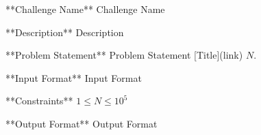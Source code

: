 **Challenge Name**  
Challenge Name

**Description**  
Description

**Problem Statement**  
Problem Statement [Title](link) $N$.

**Input Format**  
Input Format

**Constraints**  
$1 \leq N \leq 10^5$  

**Output Format**  
Output Format
